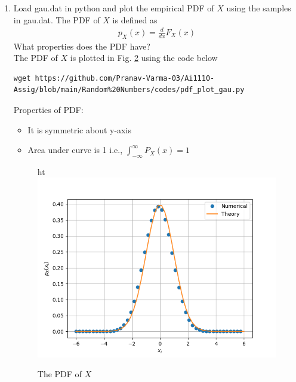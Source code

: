 \documentclass[journal,12pt,twocolumn]{IEEEtran}
\renewcommand\thesection{\arabic{section}}
\begin{document}
\begin{enumerate}[label=\thesection.\arabic*
,ref=\thesection.\theenumi]
\begin{figure}[ht]
\caption{The CDF of $X$}
\label{fig:gauss_cdf}
\end{figure}
Properties of CDF:
\begin{itemize}
    \item cdf is non decreasing fucntion
    \item $\lim_{x \to -\infty} f(x) = 0$
    \item $\lim_{x \to +\infty} f(x) = 1$
\end{itemize}
\item
Load gau.dat in python and plot the empirical PDF of $X$ using the samples in gau.dat. The PDF of $X$ is defined as
\begin{align}
p_{X}(x) = \frac{d}{dx}F_{X}(x)
\end{align}
What properties does the PDF have?
\\
\solution The PDF of $X$ is plotted in Fig. \ref{fig:gauss_pdf} using the code below
\begin{lstlisting}
wget https://github.com/Pranav-Varma-03/Ai1110-Assig/blob/main/Random%20Numbers/codes/pdf_plot_gau.py
\end{lstlisting}
Properties of PDF:
\begin{itemize}
    \item It is symmetric about y-axis
    \item Area under curve is 1 i.e., $\int_{-\infty}^{\infty} P_X(x) = 1$
\end{itemize}

\begin{figure}{ht}
\centering
\includegraphics[width=\columnwidth]{./figs/pdf_plot_gau.png}
\caption{The PDF of $X$}
\label{fig:gauss_pdf}
\end{figure}


\end{enumerate}
\end{document}
